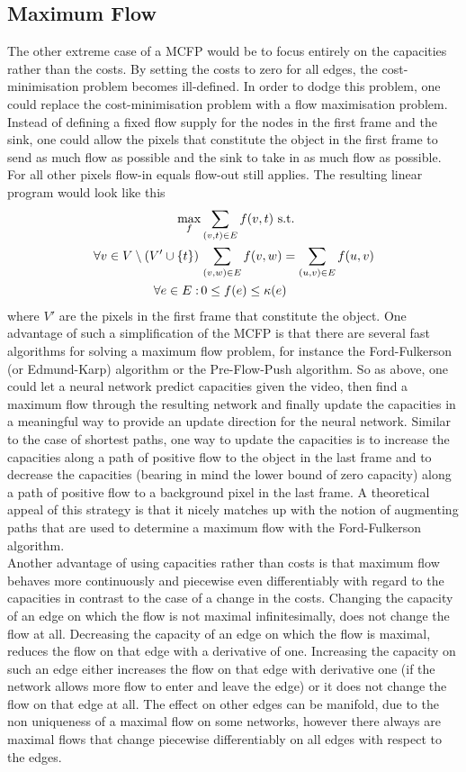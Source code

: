\documentclass{article}
\begin{document}
{\subsection{Maximum Flow}
The other extreme case of a MCFP would be to focus entirely on the capacities rather than the costs. By setting the costs to zero for all edges, the cost-minimisation problem becomes ill-defined. In order to dodge this problem, one could replace the cost-minimisation problem with a flow maximisation problem. Instead of defining a fixed flow supply for the nodes in the first frame and the sink, one could allow the pixels that constitute the object in the first frame to send as much flow as possible and the sink to take in as much flow as possible. For all other pixels flow-in equals flow-out still applies. The resulting linear program would look like this 
\begin{align}\label{MFP}
\max_f &\sum_{(v,t) \in E} f(v,t) \textnormal{ s.t.}\nonumber\\
\forall v \in V\setminus\left(V' \cup \{ t\}\right) \, & \sum_{(v,w) \in E} f(v,w) = \sum_{(u,v) \in E} f(u,v) \\
\forall	e \in E: \, & 0 \leq f(e) \leq \kappa(e) \nonumber
\end{align} 
where $V'$ are the pixels in the first frame that constitute the object. One advantage of such a simplification of the MCFP is that there are several fast algorithms for solving a maximum flow problem, for instance the Ford-Fulkerson (or Edmund-Karp) algorithm or the Pre-Flow-Push algorithm. So as above, one could let a neural network predict capacities given the video, then find a maximum flow through the resulting network and finally update the capacities in a meaningful way to provide an update direction for the neural network. Similar to the case of shortest paths, one way to update the capacities is to increase the capacities along a path of positive flow to the object in the last frame and to decrease the capacities (bearing in mind the lower bound of zero capacity) along a path of positive flow to a background pixel in the last frame. A theoretical appeal of this strategy is that it nicely matches up with the notion of augmenting paths that are used to determine a maximum flow with the Ford-Fulkerson algorithm.\\
Another advantage of using capacities rather than costs is that maximum flow behaves more continuously and piecewise even differentiably with regard to the capacities in contrast to the case of a change in the costs. Changing the capacity of an edge on which the flow is not maximal infinitesimally, does not change the flow at all. Decreasing the capacity of an edge on which the flow is maximal, reduces the flow on that edge with a derivative of one. Increasing the capacity on such an edge either increases the flow on that edge with derivative one (if the network allows more flow to enter and leave the edge) or it does not change the flow on that edge at all. The effect on other edges can be manifold, due to the non uniqueness of a maximal flow on some networks, however there always are maximal flows that change piecewise differentiably on all edges with respect to the edges. \\
}
\end{document}
